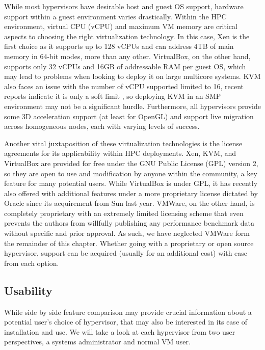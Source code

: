 While most hypervisors have desirable host and guest OS support, hardware support within a guest environment varies drastically.  Within the HPC environment, virtual CPU (vCPU) and maximum VM memory are critical aspects to choosing the right virtualization technology.  In this case, Xen is the first choice as it supports up to 128 vCPUs and can address 4TB of main memory in 64-bit modes, more than any other.  VirtualBox, on the other hand, supports only 32 vCPUs and 16GB of addressable RAM per guest OS, which may lead to problems when looking to deploy it on large multicore systems.  KVM also faces an issue with the number of vCPU supported limited to 16, recent reports indicate it is only a soft limit \cite{Harper2009}, so deploying KVM in an SMP environment may not be a significant hurdle. Furthermore, all hypervisors provide some 3D acceleration support (at least for OpenGL) and support live migration across homogeneous nodes, each with varying levels of success.  

Another vital juxtaposition of these virtualization technologies is the license agreements for its applicability within HPC deployments.  Xen, KVM, and VirtualBox are provided for free under the GNU Public License (GPL) version 2, so they are open to use and modification by anyone within the community, a key feature for many potential users.  While VirtualBox is  under GPL, it has recently also offered with additional features under a more proprietary license dictated by Oracle since its acquirement from Sun last year.  VMWare, on the other hand, is completely proprietary with an extremely limited licensing scheme that even prevents the authors from willfully publishing any performance benchmark data without specific and prior approval.  As such, we have neglected VMWare form the remainder of this chapter. Whether going with a proprietary or open source hypervisor, support can be acquired (usually for an additional cost) with ease from each option.   

\subsection{Usability}

While side by side feature comparison may provide crucial information about a potential user's choice of hypervisor, that may also be interested in its ease of installation and use.  We will take a look at each hypervisor from two user perspectives, a systems administrator and normal VM user.  

